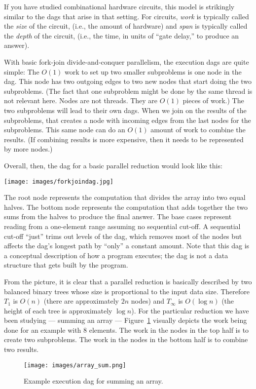 \documentclass[10pt]{article}
\begin{document}
If you have studied combinational hardware circuits, this model is
strikingly similar to the dags that arise in that setting.  For
circuits, \emph{work} is typically called the \emph{size} of the circuit,
(i.e., the amount of hardware)
and \emph{span} is typically called the \emph{depth} of the circuit,
(i.e., the time, in units of ``gate delay,'' to produce an answer).

With basic fork-join divide-and-conquer parallelism, the execution
dags are quite simple: The $O(1)$ work to set up two smaller
subproblems is one node in the dag.  This node has two outgoing edges
to two new nodes that start doing the two subproblems.  (The fact that
one subproblem might be done by the same thread is not relevant here.
Nodes are not threads. They are $O(1)$ pieces of work.)  The two
subproblems will lead to their own dags.  When we join on the results
of the subproblems, that creates a node with incoming edges from the
last nodes for the subproblems.  This same node can do an $O(1)$
amount of work to combine the results.  (If combining results is more
expensive, then it needs to be represented by more nodes.)

Overall, then, the dag for a basic parallel reduction would look like
this:

\begin{center}
\texttt{[image: images/forkjoindag.jpg]}
\end{center}

The root node represents the computation that divides the array into
two equal halves.  The bottom node represents the computation that
adds together the two sums from the halves to produce the final
answer.  The base cases represent reading from a one-element range
assuming no sequential cut-off.  A sequential cut-off ``just'' trims
out levels of the dag, which removes most of the nodes but affects the
dag's longest path by ``only'' a constant amount.  Note that this dag
is a conceptual description of how a program executes; the dag is not
a data structure that gets built by the program.

From the picture, it is clear that a parallel reduction is basically
described by two balanced binary trees whose size is proportional to
the input data size.  Therefore $T_1$ is $O(n)$ (there are
approximately $2n$ nodes) and $T_\infty$ is $O(\log n)$ (the height of
each tree is approximately $\log n$).  For the particular reduction we
have been studying --- summing an array --- Figure~\ref{fig:array_sum}
visually depicts the work being done for an example with 8 elements.
The work in the nodes in the top half is to create two subproblems.
The work in the nodes in the bottom half is to combine two results.
\begin{figure}
\begin{center}
\texttt{[image: images/array\_sum.png]}
\end{center}
\caption{Example execution dag for summing an array.}
\label{fig:array_sum}
\end{figure}
\end{document}
